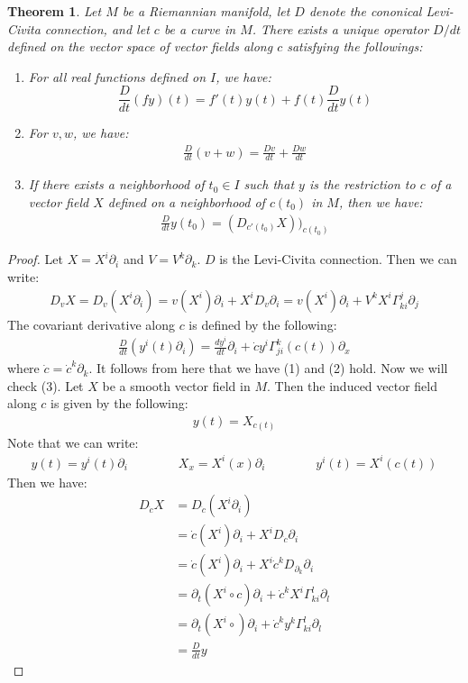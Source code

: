\documentclass[11pt]{book}
\theoremstyle{break}
\theoremstyle{break}
\newtheorem{thm}{Theorem}[section]
\newcommand{\pd}{\partial}
\begin{document}
\newpage


\begin{thm}
Let $M$ be a Riemannian manifold, let $D$ denote the cononical Levi-Civita connection, and let $c$ be a curve in $M$. There exists a unique operator $D/dt$ defined on the vector space of vector fields along $c$ satisfying the followings:
\begin{enumerate}
\item For all real functions defined on $I$, we have:
$$\frac{D}{dt} (fy)(t) =f'(t)y(t) + f(t) \frac{D}{dt}y(t)$$
\item For $v,w$, we have:
\begin{align*}
\frac{D}{dt}(v+w) = \frac{Dv}{dt} + \frac{Dw}{dt}
\end{align*}
\item If there exists a neighborhood of $t_0 \in I$ such that $y$ is the restriction to $c$ of a vector field $X$ defined on a neighborhood of $c(t_0)$ in $M$, then we have:
\begin{align*}
\frac{D}{dt}y(t_0) = \left( D_{c'(t_0)}X\right))_{c(t_0)}
\end{align*}
\end{enumerate}
\end{thm}
\begin{proof}
Let $X = X^i \pd_i$ and $V = V^k\pd_k$. $D$ is the Levi-Civita connection. Then we can write:
\begin{align*}
D_vX = D_v(X^i \pd_i) = v(X^i)\pd_i + X^i D_v\pd_i = v(X^i)\pd_i + V^kX^i\Gamma_{ki}^j \pd_j
\end{align*}
The covariant derivative along $c$ is defined by the following:
\begin{align*}
\frac{D}{dt}(y^i(t) \pd_i) = \frac{dy^i}{dt}\pd_i +\dot{c}y^i \Gamma_{ji}^k(c(t))\pd_x
\end{align*}
where $\dot{c} = \dot{c}^k \pd_k$. It follows from here that we have (1) and (2) hold. Now we will check (3). Let $X$ be a smooth vector field in $M$. Then the induced vector field along $c$ is given by the following:
\begin{align*}
y(t) = X_{c(t)}
\end{align*}
Note that we can write:
\begin{align*}
y(t) = y^i(t) \pd_i \qquad\qquad X_x = X^i(x) \pd_i \qquad\qquad y^i(t) = X^i(c(t))
\end{align*}
Then we have:
\begin{align*}
D_{\dot{c}}X &= D_{\dot{c}}(X^i \pd_i) \\
&= \dot{c}(X^i) \pd_i+X^i D_{\dot{c}}\pd_i\\
&=  \dot{c}(X^i) \pd_i + X^i \dot{c}^k D_{\pd_k}\pd_i \\
&= \pd_t (X^i \circ c) \pd_i + \dot{c}^k X^i \Gamma_{ki}^l \pd_l \\
&= \pd_t(X^i \circ ) \pd_i + \dot{c}^k y^k \Gamma_{ki}^l \pd_l \\
&= \frac{D}{dt}y
\end{align*}
\end{proof}
\end{document}
